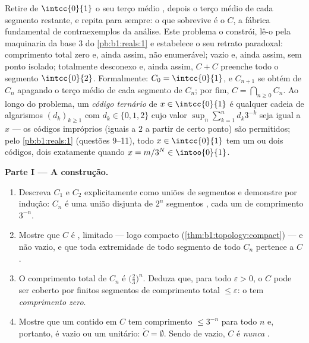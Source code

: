 \begin{problem}[{Problema de fim de semana --- o \omterm{pb:b1:topology:1}{conjunto de Cantor}
dos terços médios: comprimento zero, não enumerável, perfeito e $C + C =
\intcc{0}{2}$}]
\label{pb:b1:topology:1}
Retire de $\intcc{0}{1}$ o seu terço médio , depois o terço
médio de cada segmento restante, e repita para sempre: o que
sobrevive é o \emph{} $C$, a fábrica fundamental de
contraexemplos da análise. Este problema o constrói, lê-o
pela maquinaria da base $3$ do \cref{pb:b1:reals:1}
e estabelece o seu retrato paradoxal: comprimento total zero e, ainda
assim, não enumerável;  vazio e, ainda assim, sem ponto
isolado; totalmente desconexo e, ainda assim, $C + C$ preenche todo o
segmento $\intcc{0}{2}$. Formalmente: $C_0 = \intcc{0}{1}$,
e $C_{n+1}$ se obtém de $C_n$ apagando o terço médio  de cada
segmento de $C_n$; por fim, $C = \bigcap_{n \geq 0}
C_n$. Ao longo do problema, um
\emph{código ternário} de $x \in \intcc{0}{1}$ é qualquer cadeia de algarismos
$(d_k)_{k\geq1}$ com $d_k \in \{0, 1, 2\}$
cujo valor $\sup_n \sum_{k=1}^n d_k 3^{-k}$ seja igual a $x$ ---
os códigos impróprios (iguais a $2$ a partir de certo ponto) são
permitidos; pelo \cref{pb:b1:reals:1} (questões 9--11), todo $x \in
\intcc{0}{1}$ tem um ou dois códigos, dois exatamente quando $x = m/3^N
\in \intoo{0}{1}$.

\medskip
\noindent\textbf{Parte I --- A construção.}
\begin{enumerate}
  \item Descreva $C_1$ e $C_2$ explicitamente como uniões de
        segmentos e demonstre por indução: $C_n$ é uma união
        disjunta de $2^n$ segmentos , cada um de comprimento
        $3^{-n}$.
  \item Mostre que $C$ é , limitado --- logo compacto
        (\cref{thm:b1:topology:compact}) --- e não vazio, e que
        toda extremidade de todo segmento de todo $C_n$ pertence
        a $C$.
  \item O comprimento total de $C_n$ é $\bigl(\frac23\bigr)^n$.
        Deduza que, para todo $\varepsilon > 0$, o  $C$ pode
        ser coberto por finitos segmentos de comprimento total
        $\leq \varepsilon$: o  tem \emph{comprimento
        zero}.
  \item Mostre que um  contido em $C$ tem comprimento $\leq
        3^{-n}$ para todo $n$ e, portanto, é vazio ou um 
        unitário: $\mathring C = \emptyset$. Sendo  de 
        vazio, $C$ é \emph{nunca }.
\end{enumerate}


\end{problem}
